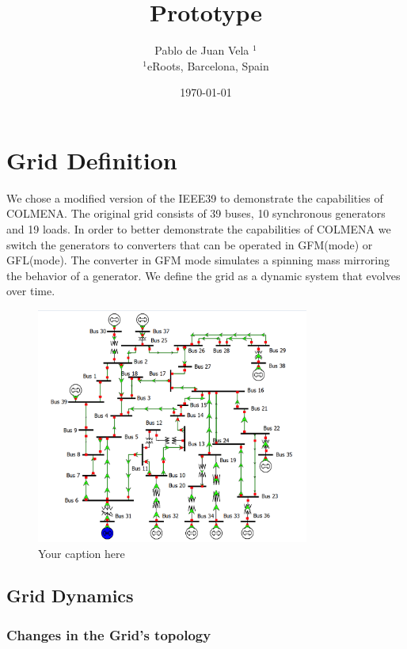 \documentclass{article}
\title{Prototype}
\author{Pablo de Juan Vela $^{1}$ \\
        \small $^{1}$eRoots, Barcelona, Spain \\
}
\date{\today}
\begin{document}
\maketitle

\section{Grid Definition}

We chose a modified version of the IEEE39 \cite{grids:ieee39} to demonstrate the capabilities of COLMENA. The original grid consists of 39 buses, 10 synchronous generators and 19 loads. In order to better demonstrate the capabilities of COLMENA we switch the generators to converters that can  be operated in GFM(mode) or GFL(mode). The converter in GFM mode simulates a spinning mass mirroring the behavior of a generator. We define the grid as a dynamic system that evolves over time.
\begin{figure}[h]
    \centering
    \begin{center}
        \includegraphics[width=0.8\textwidth]{plots/IEEE39 (1).png}
    \end{center}
    \caption{Your caption here}
    \label{fig:your_label}
\end{figure}

\subsection{Grid Dynamics}

\subsubsection*{Changes in the Grid's topology}
\end{document}
